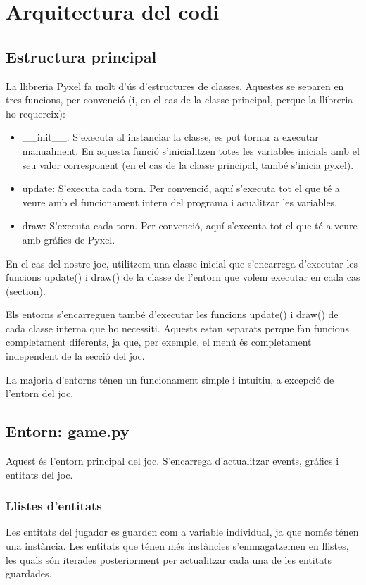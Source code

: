 \section{Arquitectura del codi}

\subsection{Estructura principal}
La llibreria Pyxel fa molt d'\'us d'estructures de classes.
Aquestes se separen en tres funcions, per convenci\'o
(i, en el cas de la classe principal, perque la llibreria ho requereix):

\begin{itemize}
\item{\_\_init\_\_:
	S'executa al instanciar la classe, es pot tornar a executar manualment.
	En aquesta funci\'o s'inicialitzen totes les variables inicials amb el seu valor
	corresponent (en el cas de la classe principal, tamb\'e s'inicia pyxel).
	}
\item{update:
	S'executa cada torn. 
	Per convenci\'o, aqu\'i s'executa tot el que t\'e a veure amb
	el funcionament intern del programa i acualitzar les variables.
	}
\item{draw:
	S'executa cada torn.
	Per convenci\'o, aqu\'i s'executa tot el que t\'e a veure amb
	gr\'afics de Pyxel.
}
\end{itemize}

En el cas del nostre joc,
utilitzem una classe inicial que s'encarrega d'executar
les funcions update() i draw() de la classe de
l'entorn que volem executar en cada cas (section).

Els entorns s'encarreguen tamb\'e d'executar les funcions update() i draw()
de cada classe interna que ho necessiti.
Aquests estan separats perque fan funcions completament diferents,
ja que, per exemple, el men\'u \'es completament independent de la secci\'o del joc.

La majoria d'entorns t\'enen un funcionament simple i intuitiu,
a excepci\'o de l'entorn del joc.


\subsection{Entorn: game.py}

Aquest \'es l'entorn principal del joc.
S'encarrega d'actualitzar events, gr\'afics i entitats del joc.


\subsubsection{Llistes d'entitats}
Les entitats del jugador es guarden com a variable individual,
ja que nom\'es t\'enen una inst\`ancia.
Les entitats que t\'enen m\'es inst\`ancies s'emmagatzemen en llistes,
les quals s\'on iterades posteriorment per
actualitzar cada una de les entitats guardades.

